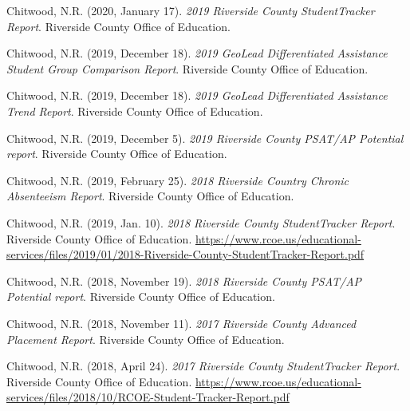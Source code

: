 

    \begin{pubitems} %
      \item {Chitwood, N.R. (2020, January 17). \textit{2019 Riverside County StudentTracker Report}. Riverside County Office of Education.}
      \item {Chitwood, N.R. (2019, December 18). \textit{2019 GeoLead Differentiated Assistance Student Group Comparison Report}. Riverside County Office of Education.}
      \item {Chitwood, N.R. (2019, December 18). \textit{2019 GeoLead Differentiated Assistance Trend Report}. Riverside County Office of Education.}
      \item {Chitwood, N.R. (2019, December 5). \textit{2019 Riverside County PSAT/AP Potential report}. Riverside County Office of Education.}
      \item {Chitwood, N.R. (2019, February 25). \textit{2018 Riverside Country Chronic Absenteeism Report}. Riverside County Office of Education.}
      \item {Chitwood, N.R. (2019, Jan. 10). \textit{2018 Riverside County StudentTracker Report}. Riverside County Office of Education. \url{https://www.rcoe.us/educational-services/files/2019/01/2018-Riverside-County-StudentTracker-Report.pdf}}
      \item {Chitwood, N.R. (2018, November 19). \textit{2018 Riverside County PSAT/AP Potential report}. Riverside County Office of Education.}
      \item {Chitwood, N.R. (2018, November 11). \textit{2017 Riverside County Advanced Placement Report}. Riverside County Office of Education.}
      \item {Chitwood, N.R. (2018, April 24). \textit{2017 Riverside County StudentTracker Report}. Riverside County Office of Education. \url{https://www.rcoe.us/educational-services/files/2018/10/RCOE-Student-Tracker-Report.pdf}}
    \end{pubitems}

